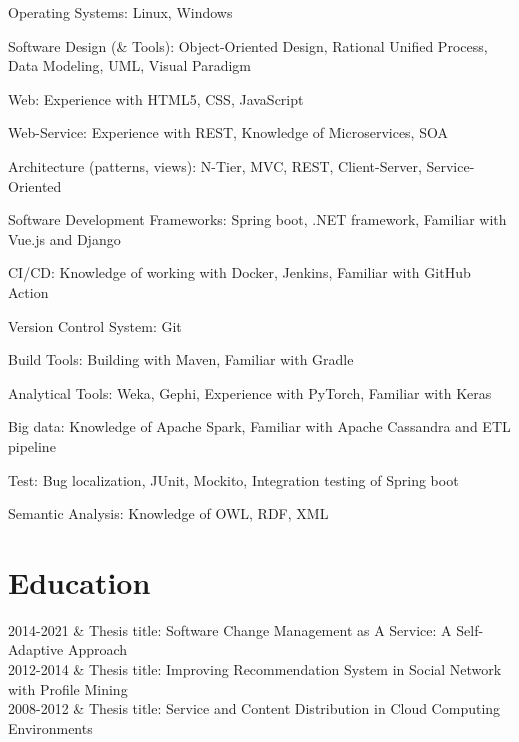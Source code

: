 \documentclass[
    changecolor={111, 156, 45}
]{cv-roald}
\begin{document}
Operating Systems: Linux, Windows

Software Design (\& Tools): Object-Oriented Design, Rational Unified Process, Data Modeling, UML, Visual Paradigm

Web: Experience with HTML5, CSS, JavaScript

Web-Service: Experience with REST,  Knowledge of Microservices, SOA

Architecture (patterns, views): N-Tier, MVC, REST, Client-Server, Service-Oriented

Software Development Frameworks: Spring boot, .NET framework, Familiar with Vue.js and Django

CI/CD: Knowledge of working with Docker, Jenkins, Familiar with GitHub Action

Version Control System: Git

Build Tools: Building with Maven, Familiar with Gradle

Analytical Tools: Weka, Gephi, Experience with PyTorch, Familiar with Keras

Big data: Knowledge of Apache Spark, Familiar with Apache Cassandra and ETL pipeline

Test: Bug localization, JUnit, Mockito, Integration testing of Spring boot 

Semantic Analysis: Knowledge of OWL, RDF, XML

\section*{Education}

\begin{tabularcv}
	2014-2021   &   
	\newline Thesis title: Software Change Management as A Service: A Self-Adaptive Approach
	\\
	2012-2014   &   
	\newline Thesis title: Improving Recommendation System in Social Network with Profile Mining 
	\\
	2008-2012   &   
	\newline Thesis title: Service and Content Distribution in Cloud Computing Environments
\end{tabularcv}
\end{document}
